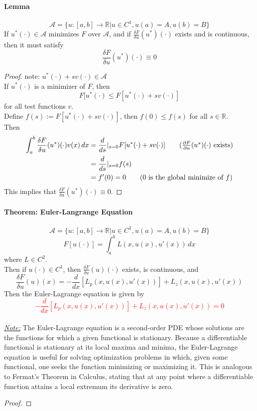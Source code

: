 \documentclass[11pt]{article}
\newcommand{\ti}[1]{\textit{#1}}
\newcommand{\mc}[1]{\mathcal{#1}}
\newcommand{\real}[0]{\mathbb{R}}
\newcommand{\under}[1]{\underline{#1}}
\begin{document}
\paragraph{Lemma}
$$\mc{A} = \{ u: [a,b] \rightarrow \real | u \in C^1, u(a) = A, u(b) = B\}$$
If $u^*(\cdot) \in \mc{A}$ minimizes $F$ over $\mc{A}$, and if $\frac{\delta F}{\delta u}(u^*)(\cdot)$ exists and is continuous, then it must satisfy
$$\frac{\delta F}{\delta u}(u^*)(\cdot) \equiv 0$$
\begin{proof}
	note: $u^*(\cdot) + sv(\cdot) \in \mc{A}$ \\
	If $u^*(\cdot)$ is a minimizer of $F$, then
	$$F[u^*(\cdot) \leq F[u^*(\cdot) + sv(\cdot)]$$
	for all test functions $v$. \\
	Define $f(s) := F[u^*(\cdot) + sv(\cdot)]$, then $f(0) \leq f(s)$ for all $s \in \real$. \\
	Then 
	\begin{align}
		\int_a^b \frac{\delta F}{\delta u}(u^*)(\cdot)v(x) \, dx
		&= \frac{d}{ds}|_{s=0} F[u^*(\cdot) + sv(\cdot)] \tag{$\frac{\partial F}{\partial u}(u^*)(\cdot)$ exists} \\
		&= \frac{d}{ds}|_{s=0} f(s)\\
		&= f'(0) = 0 \tag{0 is the global minimize of $f$}
	\end{align}
	This implies that $\frac{\delta F}{\delta u}(u^*)(\cdot) \equiv 0$.
\end{proof}

\paragraph{Theorem: Euler-Langrange Equation}
$$\mc{A} = \{ u: [a,b] \rightarrow \real | u \in C^1, u(a) = A, u(b) = B\}$$
$$F[u(\cdot)] = \int_a^b L(x,u(x),u'(x))\, dx$$
where $L \in C^2$. \\
Then if $u(\cdot) \in C^1$, then
$\frac{\delta F}{\delta u}(u)(\cdot)$ exists, is continuous, and
$$\frac{\delta F}{\delta u}(u)(x) = -\frac{d}{dx}[L_p(x,u(x),u'(x))] + L_z(x,u(x),u'(x))$$
Then the Euler-Lagrange equation is given by
\textcolor{red}{$$-\frac{d}{dx}[L_p(x,u(x),u'(x))] + L_z(x,u(x),u'(x)) = 0$$}\\
\ti{\under{Note:}} The Euler-Lagrange equation is a second-order PDE whose solutions are the functions for which a given functional is stationary. Because a differentiable functional is stationary at its local maxima and minima, the Euler-Lagrange equation is useful for solving optimization problems in which, given some functional, one seeks the function minimizing or maximizing it. This is analogous to Fermat's Theorem in Calculus, stating that at any point where a differentiable function attains a local extremum its derivative is zero. \\
\begin{proof}
	
\end{proof}
\end{document}
